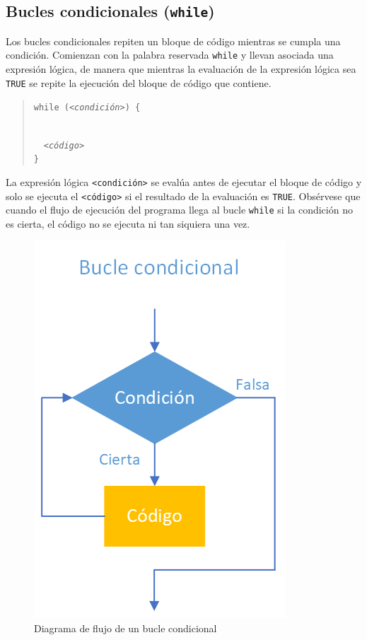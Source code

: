 \documentclass[
  a4paper,
]{scrreport}
\theoremstyle{definition}
\theoremstyle{definition}
\theoremstyle{remark}
\begin{document}
\hypertarget{bucles-condicionales-while}{%
\subsection{\texorpdfstring{Bucles condicionales
(\texttt{while})}{Bucles condicionales (while)}}\label{bucles-condicionales-while}}

Los bucles condicionales repiten un bloque de código mientras se cumpla
una condición. Comienzan con la palabra reservada \texttt{while} y
llevan asociada una expresión lógica, de manera que mientras la
evaluación de la expresión lógica sea \texttt{TRUE} se repite la
ejecución del bloque de código que contiene.

\begin{quote}
\texttt{while\ (}\emph{\texttt{\textless{}condición\textgreater{}}}\texttt{)\ \{}\strut \\
  \emph{\texttt{\textless{}código\textgreater{}}}\\
\texttt{\}}
\end{quote}

La expresión lógica \texttt{\textless{}condición\textgreater{}} se
evalúa antes de ejecutar el bloque de código y solo se ejecuta el
\texttt{\textless{}código\textgreater{}} si el resultado de la
evaluación es \texttt{TRUE}. Obsérvese que cuando el flujo de ejecución
del programa llega al bucle \texttt{while} si la condición no es cierta,
el código no se ejecuta ni tan siquiera una vez.

\begin{figure}

{\centering \includegraphics{img/04-estructuras-control/bucle-while.png}

}

\caption{Diagrama de flujo de un bucle condicional}

\end{figure}
\end{document}

